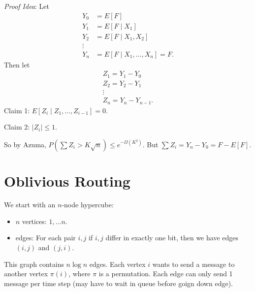 \documentclass{report}
\begin{document}
\noindent \textit{Proof Idea}: Let 
\begin{align*}
    Y_0 &= E[F] \\
    Y_1 &= E[F \mid X_1] \\
    Y_2 &= E[F \mid X_1, X_2] \\
    \vdots \\
    Y_n &= E[F \mid X_1, \ldots, X_n] = F.
\end{align*}
Then let 
\begin{align*}
    Z_1 = Y_1 - Y_0 \\
    Z_2 = Y_2 - Y_1 \\
    \vdots \\
    Z_n = Y_n - Y_{n-1}.
\end{align*}
\noindent Claim 1:  $E[Z_i \mid Z_1, \ldots, Z_{i-1}] = 0$. 

\noindent Claim 2: $|Z_i| \leq 1$. 

So by Azuma, $P(\sum Z_i > K \sqrt n) \leq e^{-\Omega(K^2)}$. But $\sum Z_i = Y_n - Y_0 = F - E[F]$. 


\chapter{Oblivious Routing}
We start with an $n$-node hypercube:
\begin{itemize}
    \item $n$ vertices: $1, \ldots n$.
    \item edges: For each pair $i,j$ if $i,j$ differ in exactly one bit, then we have edges $(i, j)$ and $(j, i)$. 
\end{itemize}
This graph contains $n \log n$ edges. Each vertex $i$ wants to send a message to another vertex $\pi(i)$, where $\pi$ is a permutation. Each edge can only send 1 message per time step (may have to wait in queue before goign down edge). 
\end{document}

